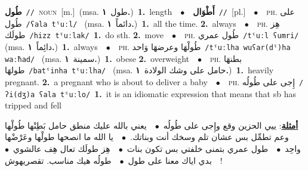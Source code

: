 \documentclass[10pt,a4paper,twoside]{article} %
\begin{document}
\begin{multicols}{2}
{\setlength\topsep{0pt}\textbf{\foreignlanguage{arabic}{طُول}}\ {\color{gray}\texttt{//}\color{black}}\ \textsc{noun}\ [m.]\ \color{gray}(msa. \foreignlanguage{arabic}{طول}~\foreignlanguage{arabic}{\textbf{١.}})\color{black}\ \textbf{1.}~length\ \ $\bullet$\ \ \setlength\topsep{0pt}\textbf{\foreignlanguage{arabic}{أَطْوَال}}\ {\color{gray}\texttt{//}\color{black}}\ [pl.]\ \ $\bullet$\ \ \textsc{ph.} \color{gray} \foreignlanguage{arabic}{على طُول}\color{black}\ {\color{gray}\texttt{/{\sffamily ʕala tˤuːl}/}\color{black}}\ \color{gray} (msa. \foreignlanguage{arabic}{دائماً}~\foreignlanguage{arabic}{\textbf{١.}})\color{black}\ \textbf{1.}~all the time.  \textbf{2.}~always\ \ $\bullet$\ \ \textsc{ph.} \color{gray} \foreignlanguage{arabic}{هِز طولَك}\color{black}\ {\color{gray}\texttt{/{\sffamily hizz tˤuːlak}/}\color{black}}\ \textbf{1.}~do sth.  \textbf{2.}~move\ \ $\bullet$\ \ \textsc{ph.} \color{gray} \foreignlanguage{arabic}{طُول عمري}\color{black}\ {\color{gray}\texttt{/{\sffamily tˤuːl ʕumri}/}\color{black}}\ \color{gray} (msa. \foreignlanguage{arabic}{دائِماً}~\foreignlanguage{arabic}{\textbf{١.}})\color{black}\ \textbf{1.}~always\ \ $\bullet$\ \ \textsc{ph.} \color{gray} \foreignlanguage{arabic}{طُولْهَا وعرضهَا وَاحد}\color{black}\ {\color{gray}\texttt{/{\sffamily tˤuːlha wuʕar(dˤ)ha waːħad}/}\color{black}}\ \color{gray} (msa. \foreignlanguage{arabic}{سمينة}~\foreignlanguage{arabic}{\textbf{١.}})\color{black}\ \textbf{1.}~obese  \textbf{2.}~overweight\ \ $\bullet$\ \ \textsc{ph.} \color{gray} \foreignlanguage{arabic}{بطنهَا طولهَا}\color{black}\ {\color{gray}\texttt{/{\sffamily batˤinha tˤuːlha}/}\color{black}}\ \color{gray} (msa. \foreignlanguage{arabic}{حامل على وشك الولادة}~\foreignlanguage{arabic}{\textbf{١.}})\color{black}\ \textbf{1.}~heavily pregnant.  \textbf{2.}~a pregnant who is about to deliver a baby\ \ $\bullet$\ \ \textsc{ph.} \color{gray} \foreignlanguage{arabic}{إِجى على طُولُه}\color{black}\ {\color{gray}\texttt{/{\sffamily ʔi(dʒ)a ʕala tˤuːlo}/}\color{black}}\ \textbf{1.}~it is an idiomatic expression that means that sb has tripped and fell\  \begin{flushright}\color{gray}\foreignlanguage{arabic}{\textbf{\underline{\foreignlanguage{arabic}{أمثلة}}}: ييي الحزين وقع وإِجى على طُولُه\ $\bullet$\ \  يعني بالله عليك منطق حامل بَطِنْها طُولْها وعم تطمِّل بس عشان تلم وسخك أنت وبناتك.\ $\bullet$\ \  يا الله ما انصحها طولْها وعَرْضْها واحِد\ $\bullet$\ \  طول عمري بتمنى خلفتي بس تكون بنات\ $\bullet$\ \  هِز طولَك تعال هِف عالشوي\ $\bullet$\ \  بدي اياك معنا على طول\ $\bullet$\ \  طولُه هيك مناسب. تقصريهوش!}\end{flushright}\color{black}} \vspace{2mm}


\end{multicols}
\end{document}
